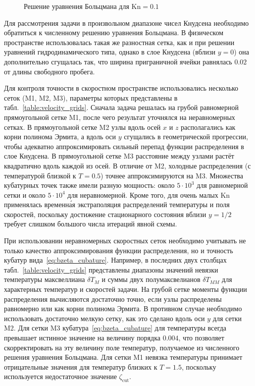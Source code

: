 \documentclass[
aps,%
12pt,%
final,%
notitlepage,%
oneside,%
onecolumn,%
nobibnotes,%
nofootinbib,%
superscriptaddress,%
noshowpacs,%
showkeys,%
floatfix,%
tightenlines,%
centertags]%
{revtex4}
\newcommand{\Kn}{\mathrm{Kn}}
\begin{document}
\begin{figure}
    \centering
    \caption{Решение уравнения Больцмана для \(\Kn=0.1\)}
    \label{fig:kn0.1}
\end{figure}

Для рассмотрения задачи в произвольном диапазоне чисел Кнудсена необходимо
обратиться к численному решению уравнения Больцмана.
В физическом пространстве использовалась такая же разностная сетка,
как и при решении уравнений гидродинамического типа,
однако в слое Кнудсена (вблизи \(y=0\)) она дополнительно сгущалась так,
что ширина приграничной ячейки равнялась \(0.02\) от длины свободного пробега.

Для контроля точности в скоростном пространстве использовались несколько сеток (M1, M2, M3),
параметры которых представлены в табл.~\ref{table:velocity_grids}.
Сначала задача решалась на грубой равномерной прямоугольной сетке M1,
после чего результат уточнялся на неравномерных сетках.
В прямоугольной сетке M2 узлы вдоль осей \(x\) и \(z\) располагались как корни полинома Эрмита,
а вдоль оси \(y\) сгущались в геометрической прогрессии,
чтобы адекватно аппроксимировать сильный перепад функции распределения в слое Кнудсена.
В прямоугольной сетке M3 расстояние между узлами растёт квадратично вдоль каждой из осей.
В отличие от M2, холодные распределения (с температурой близкой к \(T=0.5\)) точнее аппроксимируются на M3.
Множества кубатурных точек также имели разную мощность: около \(5\cdot10^3\) для равномерной сетки
и около \(5\cdot10^4\) для неравномерной.
Кроме того, для очень малых \(\Kn\) применялась временн\'{а}я экстраполяция распределений
температуры и поля скоростей, поскольку достижение стационарного состояния вблизи \(y=1/2\)
требует слишком большого числа итераций явной схемы.

При использовании неравномерных скоростных сеток необходимо учитывать не только качество аппроксимирования
функции распределения, но и точность кубатур вида~\eqref{eq:bzeta_cubature}.
Например, в последних двух столбцах табл.~\ref{table:velocity_grids} представлены диапазоны значений
невязки температуры максвеллиана \(\delta T_M\) и суммы двух полумаксвелианов \(\delta T_{MM}\)
для характерных температур и скоростей задачи.
На грубой сетке моменты функции распределения вычисляются достаточно точно,
если узлы распределены равномерно или как корни полинома Эрмита.
В противном случае необходимо использовать достаточно мелкую сетку,
как это сделано вдоль оси \(y\) для сетки M2.
Для сетки M3 кубатура~\eqref{eq:bzeta_cubature} для температуры всегда превышает истинное значение
на величину порядка \(0.004\), что позволяет скорректировать на эту величину поле температур,
получаемое из численного решения уравнения Больцмана.
Для сетки M1 невязка температуры принимает отрицательные значения для температур близких к \(T=1.5\),
поскольку используется недостаточное значение \(\zeta_{\mathrm{cut}}\).
\end{document}
